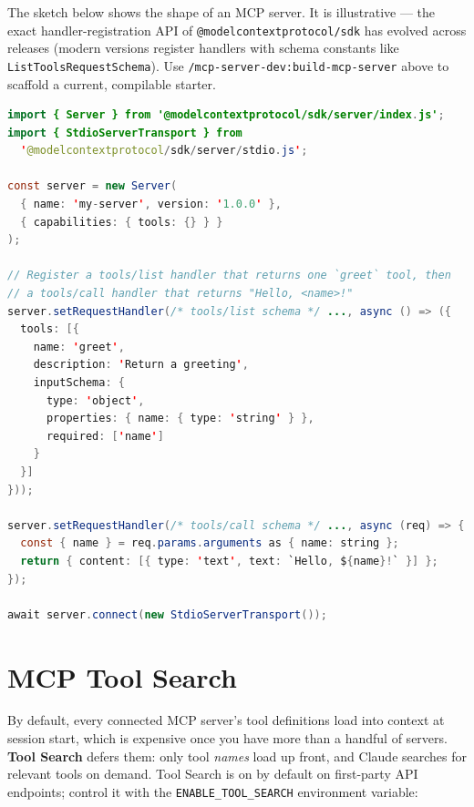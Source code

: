 The sketch below shows the shape of an MCP server. It is illustrative —
the exact handler-registration API of \texttt{@modelcontextprotocol/sdk}
has evolved across releases (modern versions register handlers with
schema constants like \texttt{ListToolsRequestSchema}). Use
\texttt{/mcp-server-dev:build-mcp-server} above to scaffold a current,
compilable starter.

\begin{lstlisting}[language=Java,caption={Minimal MCP server skeleton (TypeScript, illustrative)}]
import { Server } from '@modelcontextprotocol/sdk/server/index.js';
import { StdioServerTransport } from
  '@modelcontextprotocol/sdk/server/stdio.js';

const server = new Server(
  { name: 'my-server', version: '1.0.0' },
  { capabilities: { tools: {} } }
);

// Register a tools/list handler that returns one `greet` tool, then
// a tools/call handler that returns "Hello, <name>!"
server.setRequestHandler(/* tools/list schema */ ..., async () => ({
  tools: [{
    name: 'greet',
    description: 'Return a greeting',
    inputSchema: {
      type: 'object',
      properties: { name: { type: 'string' } },
      required: ['name']
    }
  }]
}));

server.setRequestHandler(/* tools/call schema */ ..., async (req) => {
  const { name } = req.params.arguments as { name: string };
  return { content: [{ type: 'text', text: `Hello, ${name}!` }] };
});

await server.connect(new StdioServerTransport());
\end{lstlisting}

\section{MCP Tool Search}
\label{sec:mcp-tool-search}


By default, every connected MCP server's tool definitions load into context
at session start, which is expensive once you have more than a handful of
servers. \textbf{Tool Search} defers them: only tool \emph{names} load up
front, and Claude searches for relevant tools on demand. Tool Search is on
by default on first-party API endpoints; control it with the
\texttt{ENABLE\_TOOL\_SEARCH} environment variable:

